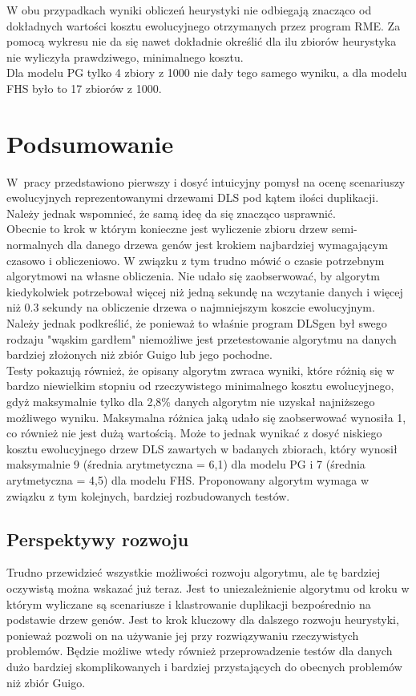 \documentclass[licencjacka]{pracamgr}
\begin{document}
W obu przypadkach wyniki obliczeń heurystyki nie odbiegają znacząco od dokładnych wartości kosztu ewolucyjnego otrzymanych przez program RME. Za pomocą wykresu nie da się nawet dokładnie określić dla ilu zbiorów heurystyka nie wyliczyła prawdziwego, minimalnego kosztu.\\
Dla modelu PG tylko 4 zbiory z 1000 nie dały tego samego wyniku, a dla modelu FHS było to 17 zbiorów z 1000.

\chapter{Podsumowanie}

W~pracy przedstawiono pierwszy i dosyć intuicyjny pomysł na ocenę scenariuszy ewolucyjnych reprezentowanymi drzewami DLS pod kątem ilości duplikacji. Należy jednak wspomnieć, że samą ideę da się znacząco usprawnić. 
\\
Obecnie to krok w którym konieczne jest wyliczenie zbioru drzew semi-normalnych dla danego drzewa genów jest krokiem najbardziej wymagającym czasowo i obliczeniowo.  W związku z tym trudno mówić o czasie potrzebnym algorytmowi na własne obliczenia. Nie udało się zaobserwować, by algorytm kiedykolwiek potrzebował więcej niż jedną sekundę na wczytanie danych i więcej niż 0.3 sekundy na obliczenie drzewa o najmniejszym koszcie ewolucyjnym. Należy jednak podkreślić, że ponieważ to właśnie program DLSgen był swego rodzaju "wąskim gardłem"  niemożliwe jest przetestowanie algorytmu na danych bardziej złożonych niż zbiór Guigo lub jego pochodne. 
\\
Testy pokazują również, że opisany algorytm zwraca wyniki, które różnią się w bardzo niewielkim stopniu od rzeczywistego minimalnego kosztu ewolucyjnego, gdyż maksymalnie tylko dla 2,8\% danych algorytm nie uzyskał najniższego możliwego wyniku. Maksymalna różnica jaką udało się zaobserwować wynosiła 1, co również nie jest dużą wartością. Może to jednak wynikać z dosyć niskiego kosztu ewolucyjnego drzew DLS zawartych w badanych zbiorach, który wynosił maksymalnie 9 (średnia arytmetyczna = 6,1) dla modelu PG i 7 (średnia arytmetyczna = 4,5) dla modelu FHS. Proponowany algorytm wymaga w związku z tym kolejnych, bardziej rozbudowanych testów.


\section{Perspektywy rozwoju}

Trudno przewidzieć wszystkie możliwości rozwoju algorytmu, ale tę bardziej
oczywistą można wskazać już teraz.  Jest to uniezależnienie algorytmu od kroku w którym wyliczane są scenariusze i klastrowanie duplikacji bezpośrednio na podstawie drzew genów. Jest to krok kluczowy dla dalszego rozwoju heurystyki, ponieważ pozwoli on na używanie jej przy rozwiązywaniu rzeczywistych problemów. Będzie możliwe wtedy również przeprowadzenie testów dla danych dużo bardziej skomplikowanych i bardziej przystających do obecnych problemów niż zbiór Guigo.
\end{document}
